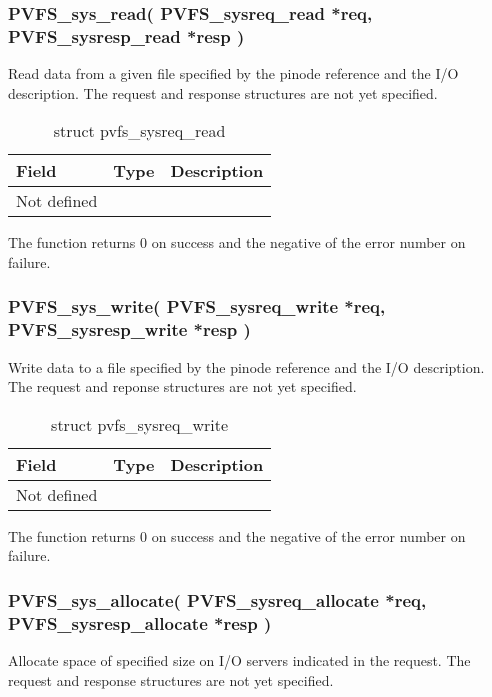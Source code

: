 \documentclass[11pt, letterpaper]{article}
\begin{document}
\subsubsection{PVFS\_sys\_read(
PVFS\_sysreq\_read *req,
PVFS\_sysresp\_read *resp
)}

Read data from a given file specified by the pinode reference
and the I/O description. The request and response structures
are not yet specified.

\begin{table}[H]
\begin{tabular}{|l|l|l|}
\hline
Field & Type & Description \\
\hline
\hline
Not defined & & \\
\hline
\end{tabular}
\caption{struct pvfs\_sysreq\_read}\label{tab:reqread}
\end{table}

The function returns 0 on success and the negative of the error
number on failure.

\subsubsection{PVFS\_sys\_write(
PVFS\_sysreq\_write *req,
PVFS\_sysresp\_write *resp
)}

Write data to a file specified by the pinode reference and the
I/O description. The request and reponse structures are not yet 
specified.

\begin{table}[H]
\begin{tabular}{|l|l|l|}
\hline
Field & Type & Description \\
\hline
\hline
Not defined & & \\
\hline
\end{tabular}
\caption{struct pvfs\_sysreq\_write}\label{tab:reqwrite}
\end{table}

The function returns 0 on success and the negative of the error
number on failure.

\subsubsection{PVFS\_sys\_allocate(
PVFS\_sysreq\_allocate *req,
PVFS\_sysresp\_allocate *resp
)}

Allocate space of specified size on I/O servers indicated in the
request. The request and response structures are not yet specified.
\end{document}
